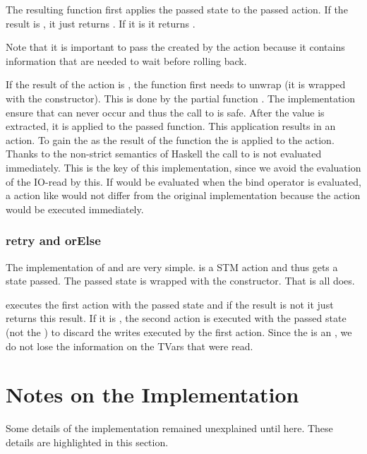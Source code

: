The resulting function first applies the passed state to the passed action. 
If the result is , it just returns . If it is
 it returns . 

Note that it is important to 
pass the  created by the action because it contains information that
are needed to wait before rolling back. 

If the result of the action is 
, the function first needs to unwrap  (it is wrapped with 
the  constructor). This is done by the partial function . The
implementation ensure that  can never occur and thus the call to 
 is safe. After the value is extracted, it is applied to the passed 
function. This application results in an  action. To gain the  as 
the result of the function the  is applied to the action.
Thanks to the non-strict semantics of Haskell the call to  is not evaluated 
immediately. This is the key of this implementation, since we avoid the evaluation of 
the IO-read by this. If  would be evaluated when the bind operator is evaluated,
a action like  would not differ from the original implementation
because the  action would be executed immediately. 

\subsubsection{retry and orElse}
The implementation of  and  are very simple.  is a 
STM action and thus gets a state passed. The passed state is wrapped with the  constructor.
That is all  does. 

 executes the first action with the passed state and if the result is not 
 it just returns this result. If it is ,
the second action is executed with the passed state (not the ) to discard the 
writes executed by the first action. Since the  is an , 
we do not lose the information on the TVars that were read. 



\section{Notes on the Implementation}
Some details of the implementation remained unexplained until here. These details are highlighted
in this section.

